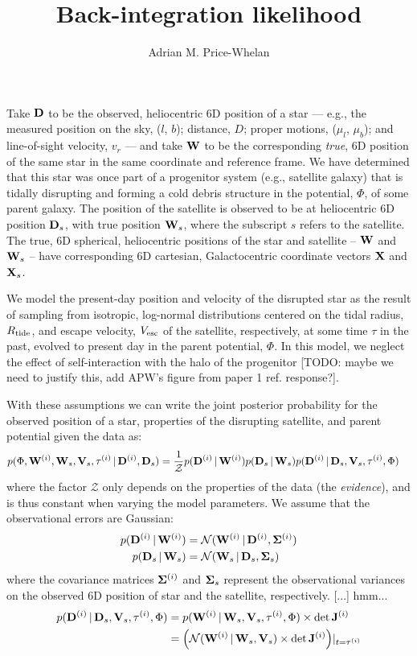 \documentclass[letterpaper,12pt,preprint]{aastex}
\newcommand{\given}{\,|\,}
\newcommand{\D}{{\bf D}}
\newcommand{\W}{{\bf W}}
\newcommand{\X}{{\bf X}}
\newcommand{\V}{{\bf V}}
\newcommand{\bSigma}{{\bf \Sigma}}
\begin{document}
\title{Back-integration likelihood}
\author{Adrian M. Price-Whelan}

Take ${\bf D}$ to be the observed, heliocentric 6D position of a star --- e.g., the measured position on the sky, ($l$, $b$); distance, $D$; proper motions, ($\mu_l$, $\mu_b$); and line-of-sight velocity, $v_r$ --- and take ${\bf W}$ to be the corresponding \emph{true}, 6D position of the same star in the same coordinate and reference frame. We have determined that this star was once part of a progenitor system (e.g., satellite galaxy) that is tidally disrupting and forming a cold debris structure in the potential, $\Phi$, of some parent galaxy. The position of the satellite is observed to be at heliocentric 6D position ${\bf D}_s$, with true position ${\bf W}_s$, where the subscript $s$ refers to the satellite. The true, 6D spherical, heliocentric positions of the star and satellite -- $\W$ and $\W_s$ -- have corresponding 6D cartesian, Galactocentric coordinate vectors $\X$ and $\X_s$. 

We model the present-day position and velocity of the disrupted star as the result of sampling from isotropic, log-normal distributions centered on the tidal radius, $R_{\rm tide}$, and escape velocity, $V_{\rm esc}$ of the satellite, respectively, at some time $\tau$ in the past, evolved to present day in the parent potential, $\Phi$. In this model, we neglect the effect of self-interaction with the halo of the progenitor [TODO: maybe we need to justify this, add APW's figure from paper 1 ref. response?].

With these assumptions we can write the joint posterior probability for the observed position of a star, properties of the disrupting satellite, and parent potential given the data as:
\begin{align}
	p(\Phi, \W^{(i)}, \W_s, \V_s, \tau^{(i)} \given \D^{(i)}, \D_s) &= 
		\frac{1}{\mathcal{Z}} p(\D^{(i)} \given \W^{(i)}) p(\D_s \given \W_s) p(\D^{(i)} \given \D_s, \V_s, \tau^{(i)}, \Phi)
\end{align}
where the factor $\mathcal{Z}$ only depends on the properties of the data (the \emph{evidence}), and is thus constant when varying the model parameters. We assume that the observational errors are Gaussian:
\begin{align}
	p(\D^{(i)} \given \W^{(i)}) &= \mathcal{N}(\W^{(i)} \given \D^{(i)}, \bSigma^{(i)})\\
	p(\D_s \given \W_s) &= \mathcal{N}(\W_s \given \D_s, \bSigma_s)
\end{align}
where the covariance matrices $\bSigma^{(i)}$ and $\bSigma_s$ represent the observational variances on the observed 6D position of star and the satellite, respectively. [...] hmm...
\begin{align}
	p(\D^{(i)} \given \D_s, \V_s, \tau^{(i)}, \Phi) &= p(\W^{(i)} \given \W_s, \V_s, \tau^{(i)}, \Phi) \times \det{\bf J}^{(i)}\\
	&= \left(\mathcal{N}(\W^{(i)} \given \W_s, \V_s) \times \det{\bf J}^{(i)}\right)\rvert_{t=\tau^{(i)}}
\end{align}
\end{document}
